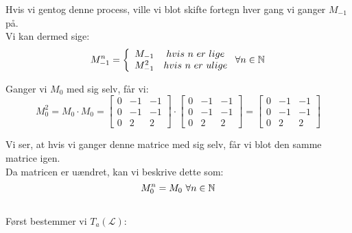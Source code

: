 \documentclass[a4paper,12pt]{article}
\begin{document}
Hvis vi gentog denne process, ville vi blot skifte fortegn hver gang vi ganger $M_{-1}$ på.\\
Vi kan dermed sige:\\

\[
M_{-1}^n = \left\{
\begin{array}{cc}
    M_{-1} & hvis \ n \ er \ lige
    \\
    M_{-1}^2 & hvis \ n \ er \ ulige
\end{array}
\ \forall n\in \mathbb{N} \\
\right.
\]

Ganger vi $M_0$ med sig selv, får vi:\\
\[
M_{0}^2 = M_{0}\cdot M_{0}=
\left[\begin{array}{ccc}
    0 & -1 & -1 \\
    0 & -1 & -1 \\
    0 & 2 & 2
\end{array}\right]
\cdot
\left[\begin{array}{ccc}
    0 & -1 & -1 \\
    0 & -1 & -1 \\
    0 & 2 & 2
\end{array}\right]
=
\left[\begin{array}{ccc}
    0 & -1 & -1 \\
    0 & -1 & -1 \\
    0 & 2 & 2
\end{array}\right]
\]

Vi ser, at hvis vi ganger denne matrice med sig selv, får vi blot den samme matrice igen.\\
Da matricen er uændret, kan vi beskrive dette som:
\[
M_{0}^n = M_0 \ \forall n \in \mathbb{N}
\]

\subsection{}
Først bestemmer vi $T_a(\mathcal{L})$:\\
\end{document}
